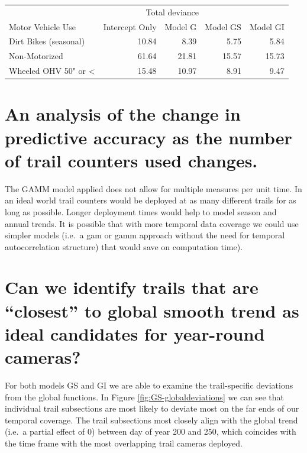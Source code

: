 \documentclass[
]{book}
\begin{document}
\begin{table}
\centering
\begin{tabular}{lrrrr}
\toprule
\multicolumn{1}{c}{ } & \multicolumn{3}{c}{Total deviance} \\
\cmidrule(l{3pt}r{3pt}){2-4}
Motor Vehicle Use & Intercept Only & Model G & Model GS & Model GI\\
\midrule
Dirt Bikes (seasonal) & 10.84 & 8.39 & 5.75 & 5.84\\
Non-Motorized & 61.64 & 21.81 & 15.57 & 15.73\\
Wheeled OHV 50" or < & 15.48 & 10.97 & 8.91 & 9.47\\
\bottomrule
\end{tabular}
\end{table}

\hypertarget{an-analysis-of-the-change-in-predictive-accuracy-as-the-number-of-trail-counters-used-changes.}{%
\section{An analysis of the change in predictive accuracy as the number of trail counters used changes.}\label{an-analysis-of-the-change-in-predictive-accuracy-as-the-number-of-trail-counters-used-changes.}}

The GAMM model applied does not allow for multiple measures per unit time. In an ideal world trail counters would be deployed at as many different trails for as long as possible. Longer deployment times would help to model season and annual trends. It is possible that with more temporal data coverage we could use simpler models (i.e.~a gam or gamm approach without the need for temporal autocorrelation structure) that would save on computation time).

\hypertarget{can-we-identify-trails-that-are-closest-to-global-smooth-trend-as-ideal-candidates-for-year-round-cameras}{%
\section{Can we identify trails that are ``closest'' to global smooth trend as ideal candidates for year-round cameras?}\label{can-we-identify-trails-that-are-closest-to-global-smooth-trend-as-ideal-candidates-for-year-round-cameras}}

For both models GS and GI we are able to examine the trail-specific deviations from the global functions. In Figure \ref{fig:GS-globaldeviations} we can see that individual trail subsections are most likely to deviate most on the far ends of our temporal coverage. The trail subsections most closely align with the global trend (i.e.~a partial effect of 0) between day of year 200 and 250, which coincides with the time frame with the most overlapping trail cameras deployed.
\end{document}

